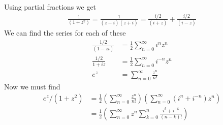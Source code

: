 \documentclass{article}
\begin{document}
\begin{enumerate}
\begin{enumerate}[label=(\roman*)]
          Using partial fractions we get
          \begin{align*}
            \frac{1}{(1+z^2)}=\frac{1}{(z-i)(z+i)}=\frac{i/2}{(i+z)}+\frac{i/2}{(i-z)}
          \end{align*}
          We can find the series for each of these
          \begin{align*}
            \frac{1/2}{(1-zi)}&=\frac{1}{2}\sum_{n=0}^\infty i^nz^n\\
            \frac{1/2}{1+iz}&=\frac{1}{2}\sum_{n=0}^\infty i^{-n}z^n\\
            e^z&=\sum_{n=0}^\infty\frac{z^n}{n!}
          \end{align*}
          Now we must find
          \begin{align*}
            e^z/(1+z^2)&=\frac{1}{2}\left(\sum_{n=0}^\infty\frac{z^n}{n!}\right)
              \left(\sum_{n=0}^\infty (i^n+i^{-n})z^n\right)\\
            &=\frac{1}{2}\left(\sum_{n=0}^\infty z^n
              \sum_{k=0}^n\frac{i^k+i^{-k}}{(n-k)!}\right)
          \end{align*}
      \end{enumerate}
  \end{enumerate}
\end{document}
